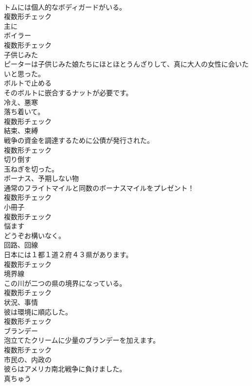 \documentclass[8pt]{extreport}
\begin{document}
\begin{CJK}{UTF8}{min}
\\	トムには個人的なボディガードがいる。	
\\	複数形チェック
\\	[副詞]	主に	
\\	[名詞]	ボイラー	
\\	複数形チェック
\\	[形容詞]	子供じみた	
\\	ピーターは子供じみた娘たちにほとほとうんざりして、真に大人の女性に会いたいと思った。	
\\	[動詞]	ボルトで止める	
\\	そのボルトに嵌合するナットが必要です。	
\\	[名詞]	冷え、悪寒	
\\	落ち着いて。	
\\	複数形チェック
\\	[名詞]	結束、束縛	
\\	戦争の資金を調達するために公債が発行された。	
\\	複数形チェック
\\	[動詞]	切り倒す	
\\	玉ねぎを切った。	
\\	[名詞]	ボーナス、予期しない物	
\\	通常のフライトマイルと同数のボーナスマイルをプレゼント！	
\\	複数形チェック
\\	[名詞]	小冊子	
\\	複数形チェック
\\	[動詞]	悩ます	
\\	どうぞお構いなく。	
\\	[名詞]	回路、回線	
\\	日本には１都１道２府４３県があります。	
\\	複数形チェック
\\	[名詞]	境界線	
\\	この川が二つの県の境界になっている。	
\\	複数形チェック
\\	[名詞]	状況、事情	
\\	彼は環境に順応した。	
\\	複数形チェック
\\	[名詞]	ブランデー	
\\	泡立てたクリームに少量のブランデーを加えます。	
\\	複数形チェック
\\	[形容詞]	市⺠の、内政の	
\\	彼らはアメリカ南北戦争に負けました。	
\\	[名詞]	真ちゅう	

\end{CJK}
\end{document}
